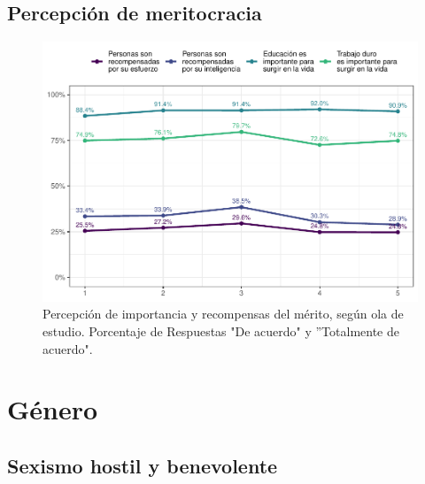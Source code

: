 \documentclass[
  12pt,
  openany]{book}
\begin{document}
\hypertarget{percepciuxf3n-de-meritocracia}{%
\section{Percepción de meritocracia}\label{percepciuxf3n-de-meritocracia}}

\begin{figure}

{\centering \includegraphics{reporte-elsoc_files/figure-latex/merit-wave-1} 

}

\caption{Percepción de importancia y recompensas del mérito, según ola de estudio. Porcentaje de Respuestas "De acuerdo" y ”Totalmente de acuerdo".}\label{fig:merit-wave}
\end{figure}

\hypertarget{guxe9nero}{%
\chapter{Género}\label{guxe9nero}}

\hypertarget{sexismo-hostil-y-benevolente}{%
\section{Sexismo hostil y benevolente}\label{sexismo-hostil-y-benevolente}}
\end{document}
